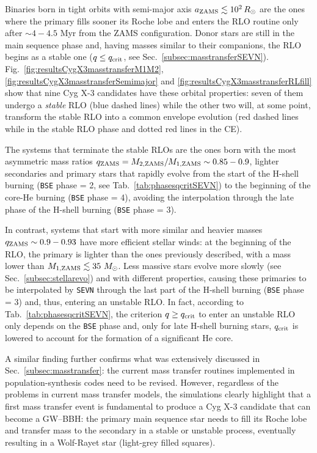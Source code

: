 \documentclass[a4paper,titlepage]{book}     	%
\newcommand{\sun}{\ensuremath{_\odot}}
\newcommand{\msun}{\ensuremath{M\sun}}
\newcommand{\rsun}{R_{\odot}}
\begin{document}
Binaries born in tight orbits with semi-major axis $a_{\rm ZAMS} \lesssim 10^2\,{}\rsun$ are the ones where the primary fills sooner its Roche lobe and enters the RLO routine only after $\sim 4 - 4.5$ Myr from the ZAMS configuration. Donor stars are still in the main sequence phase and, having masses similar to their companions, the RLO begins as a stable one ($q \leq q_{\rm crit}$, see Sec.\ \ref{subsec:masstransferSEVN}). Fig.\ \ref{fig:resultsCygX3masstransferM1M2}, \ref{fig:resultsCygX3masstransferSemimajor} and \ref{fig:resultsCygX3masstransferRLfill} show that nine Cyg X-3 candidates have these orbital properties: seven of them undergo a \emph{stable} RLO (blue dashed lines) while the other two will, at some point, transform the stable RLO into a common envelope evolution (red dashed lines while in the stable RLO phase and dotted red lines in the CE).

The systems that terminate the stable RLOs are the ones born with the most asymmetric mass ratios $q_{\rm ZAMS}=M_{\rm 2, ZAMS}/M_{\rm 1,ZAMS} \sim 0.85-0.9$, lighter secondaries and primary stars that rapidly evolve from the start of the H-shell burning (\texttt{BSE} phase = 2, see Tab.\ \ref{tab:phasesqcritSEVN}) to the beginning of the core-He burning (\texttt{BSE} phase = 4), avoiding the interpolation through the late phase of the H-shell burning (\texttt{BSE} phase = 3). 

In contrast, systems that start with more similar and heavier masses $q_{\rm ZAMS} \sim 0.9-0.93$ have more efficient stellar winds: at the beginning of the RLO, the primary is lighter than the ones previously described, with a mass lower than $M_{\rm 1,ZAMS} \lesssim 35~\msun$. Less massive stars evolve more slowly (see Sec.\ \ref{subsec:stellarevo}) and with different properties, causing these primaries to be interpolated by \texttt{SEVN} through the last part of the H-shell burning (\texttt{BSE} phase = 3) and, thus, entering an unstable RLO. In fact, according to Tab.\ \ref{tab:phasesqcritSEVN}, the criterion $q \geq q_{\rm crit}$ to enter an unstable RLO only depends on the \texttt{BSE} phase and, only for late H-shell burning stars, $q_{\rm crit}$ is lowered to account for the formation of a significant He core.

A similar finding further confirms what was extensively discussed in Sec.\ \ref{subsec:masstransfer}: the current mass transfer routines implemented in population-synthesis codes need to be revised. However, regardless of the problems in current mass transfer models, the simulations clearly highlight that a first mass transfer event is fundamental to produce a Cyg X-3 candidate that can become a GW--BBH: the primary main sequence star needs to fill its Roche lobe and transfer mass to the secondary in a stable or unstable process, eventually resulting in a Wolf-Rayet star (light-grey filled squares).\\
\end{document}
